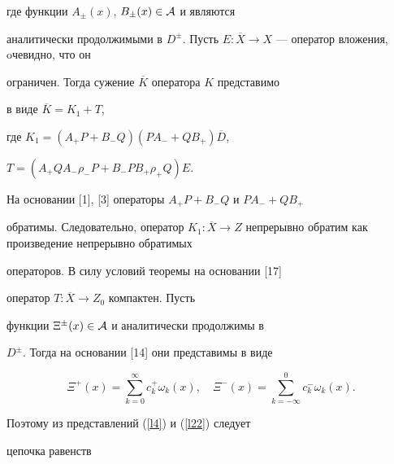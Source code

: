 где функции $A_\pm (x)$, $B_\pm (x) \in {\cal A}$ и являются


аналитически продолжимыми в $D^\pm$. Пусть $E: 


\overline{X}\rightarrow X$ --- оператор вложения, oчевидно, что он


ограничен. Тогда сужение $\overline{K}$ оператора $K$ представимо


в виде $\overline{K}=K_1+T$,


где $K_1=(A_+P+B_-Q)(PA_-+QB_+)\overline{D}$,


$T=(A_+QA_-\rho_-P+B_-PB_+\rho_+Q)E$.


На основании [1], [3] операторы $A_+P+B_-Q$ и $PA_-+QB_+$


обратимы. Следовательно, оператор $K_1:  \overline{X}\rightarrow


Z$ непрерывно обратим как произведение непрерывно обратимых


операторов. В силу условий теоремы на основании [17]


оператор $T: \overline{X}\rightarrow Z_0$ компактен. Пусть


функции $\Xi^\pm(x) \in {\cal A}$ и аналитически продолжимы в


$D^\pm$. Тогда на основании [14] они представимы в виде


\begin{equation}


\label{l22} \Xi^+(x)=\sum\limits_{k=0}^\infty c_k^+\omega_k(x),


\quad \Xi^-(x)=\sum\limits_{k=-\infty}^0 c_k^-\omega_k(x).


\end{equation}


Поэтому из представлений (\ref{l4}) и (\ref{l22}) следует


цепочка равенств


